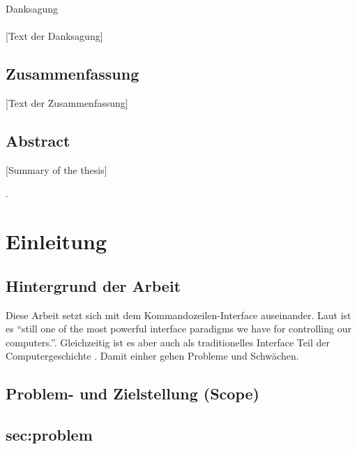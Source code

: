 \documentclass[oneside,bibliography=totocnumbered,BCOR=5mm]{scrbook}
\begin{document}
\thispagestyle{empty}
\vspace*{2.2cm}
\noindent
{\Huge Danksagung}\\
\vspace*{1.6cm} \\


[Text der Danksagung]

\newpage
\thispagestyle{empty}
\section*{Zusammenfassung}
[Text der Zusammenfassung]

\section*{Abstract}
[Summary of the thesis]

\clearpage
{}
\tableofcontents
.
\newpage

\chapter{Einleitung}
\label{sec:einleitung}

\section{Hintergrund der Arbeit}

Diese Arbeit setzt sich mit dem Kommandozeilen-Interface auseinander. Laut
\cite{Raskin_2008} ist es ``still one of the most powerful interface paradigms
we have for controlling our computers.''. Gleichzeitig ist es aber auch als
traditionelles Interface Teil der Computergeschichte \parencite{nielson1993}.
Damit einher gehen Probleme und Schwächen.

\section{Problem- und Zielstellung (Scope)}

\section{sec:problem}
\end{document}
